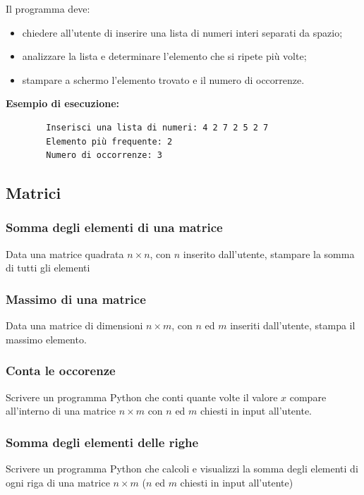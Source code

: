 \documentclass[a4paper,12pt]{article}
\begin{document}
	Il programma deve:
	\begin{itemize}
		\item chiedere all’utente di inserire una lista di numeri interi separati da spazio;
		\item analizzare la lista e determinare l’elemento che si ripete più volte;
		\item stampare a schermo l’elemento trovato e il numero di occorrenze.
	\end{itemize}
	
	\textbf{Esempio di esecuzione:}
	\begin{verbatim}
		Inserisci una lista di numeri: 4 2 7 2 5 2 7
		Elemento più frequente: 2
		Numero di occorrenze: 3
	\end{verbatim}
	
	\newpage
	
	\subsection{Matrici}

	\subsubsection{Somma degli elementi di una matrice}
	Data una matrice quadrata $n \times n$, con $n$ inserito dall'utente, stampare la somma di tutti gli elementi
	
	\subsubsection{Massimo di una matrice}
	Data una matrice di dimensioni $n \times m$, con $n$ ed $m$ inseriti dall'utente, stampa il massimo elemento.
	
	\subsubsection{Conta le occorenze}
	Scrivere un programma Python che conti quante volte il valore $x$ compare all'interno di una matrice $n \times m$ con $n$ ed $m$ chiesti in input all'utente.
	
	\subsubsection{Somma degli elementi delle righe}
	Scrivere un programma Python che calcoli e visualizzi la somma degli elementi di ogni riga di una matrice $n \times m$ ($n$ ed $m$ chiesti in input all'utente)
	 
\end{document}
